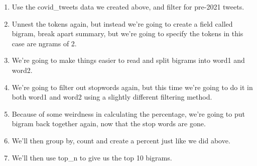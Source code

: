 \documentclass[
  letterpaper,
  DIV=11,
  numbers=noendperiod]{scrreprt}
\newenvironment{Shaded}{\begin{snugshade}}{\end{snugshade}}
\newcommand{\AttributeTok}[1]{\textcolor[rgb]{0.40,0.45,0.13}{#1}}
\newcommand{\ConstantTok}[1]{\textcolor[rgb]{0.56,0.35,0.01}{#1}}
\newcommand{\DecValTok}[1]{\textcolor[rgb]{0.68,0.00,0.00}{#1}}
\newcommand{\FunctionTok}[1]{\textcolor[rgb]{0.28,0.35,0.67}{#1}}
\newcommand{\NormalTok}[1]{\textcolor[rgb]{0.00,0.23,0.31}{#1}}
\newcommand{\SpecialCharTok}[1]{\textcolor[rgb]{0.37,0.37,0.37}{#1}}
\newcommand{\StringTok}[1]{\textcolor[rgb]{0.13,0.47,0.30}{#1}}
\providecommand{\tightlist}{%
  \setlength{\itemsep}{0pt}\setlength{\parskip}{0pt}}\usepackage{longtable,booktabs,array}
\begin{document}
\begin{enumerate}
\def\labelenumi{\arabic{enumi}.}
\tightlist
\item
  Use the covid\_tweets data we created above, and filter for pre-2021
  tweets.
\item
  Unnest the tokens again, but instead we're going to create a field
  called bigram, break apart summary, but we're going to specify the
  tokens in this case are ngrams of 2.
\item
  We're going to make things easier to read and split bigrams into word1
  and word2.
\item
  We're going to filter out stopwords again, but this time we're going
  to do it in both word1 and word2 using a slightly different filtering
  method.
\item
  Because of some weirdness in calculating the percentage, we're going
  to put bigram back together again, now that the stop words are gone.
\item
  We'll then group by, count and create a percent just like we did
  above.
\item
  We'll then use top\_n to give us the top 10 bigrams.
\end{enumerate}

\begin{Shaded}
\end{Shaded}
\end{document}
